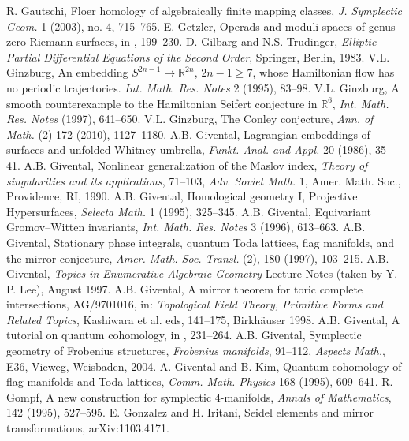 
 R. Gautschi, Floer homology of algebraically finite mapping classes, \emph{J. Symplectic Geom.} 1 (2003), no. 4, 715--765.
 E. Getzler, Operads and moduli spaces of genus zero Riemann surfaces, in \cite{src-80}, 199--230.
 D. Gilbarg and N.S. Trudinger, \emph{Elliptic Partial Differential Equations of the Second Order}, Springer, Berlin, 1983.
 V.L. Ginzburg, An embedding $S^{2n-1}\to\mathbb R^{2n}$, $2n-1\geq 7$, whose Hamiltonian flow has no periodic trajectories. \emph{Int. Math. Res. Notes} 2 (1995), 83--98.
 V.L. Ginzburg, A smooth counterexample to the Hamiltonian Seifert conjecture in $\mathbb R^6$, \emph{Int. Math. Res. Notes} (1997), 641--650.
 V.L. Ginzburg, The Conley conjecture, \emph{Ann. of Math.} (2) 172 (2010), 1127--1180.
 A.B. Givental, Lagrangian embeddings of surfaces and unfolded Whitney umbrella, \emph{Funkt. Anal. and Appl.} 20 (1986), 35--41.
 A.B. Givental, Nonlinear generalization of the Maslov index, \emph{Theory of singularities and its applications}, 71--103, \emph{Adv. Soviet Math.} 1, Amer. Math. Soc., Providence, RI, 1990.
 A.B. Givental, Homological geometry I, Projective Hypersurfaces, \emph{Selecta Math.} 1 (1995), 325--345.
 A.B. Givental, Equivariant Gromov--Witten invariants, \emph{Int. Math. Res. Notes} 3 (1996), 613--663.
 A.B. Givental, Stationary phase integrals, quantum Toda lattices, flag manifolds, and the mirror conjecture, \emph{Amer. Math. Soc. Transl.} (2), 180 (1997), 103--215.
 A.B. Givental, \emph{Topics in Enumerative Algebraic Geometry} Lecture Notes (taken by Y.-P. Lee), August 1997.
 A.B. Givental, A mirror theorem for toric complete intersections, AG/9701016, in: \emph{Topological Field Theory, Primitive Forms and Related Topics}, Kashiwara et al. eds, 141--175, Birkh\"auser 1998.
 A.B. Givental, A tutorial on quantum cohomology, in \cite{src-103}, 231--264.
 A.B. Givental, Symplectic geometry of Frobenius structures, \emph{Frobenius manifolds}, 91--112, \emph{Aspects Math.}, E36, Vieweg, Weisbaden, 2004.
 A. Givental and B. Kim, Quantum cohomology of flag manifolds and Toda lattices, \emph{Comm. Math. Physics} 168 (1995), 609--641.
 R. Gompf, A new construction for symplectic 4-manifolds, \emph{Annals of Mathematics}, 142 (1995), 527--595.
 E. Gonzalez and H. Iritani, Seidel elements and mirror transformations, arXiv:1103.4171.
